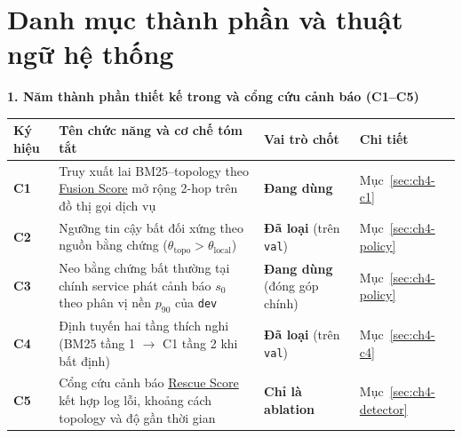 \documentclass[a4paper,table]{article}
\theoremstyle{definition}
\newcommand{\splitname}[1]{\texttt{#1}}
\newcommand{\tblfont}{\fontsize{10.5pt}{14.5pt}\selectfont}
\begin{document}
\cleardoublepage
{}
{}
\section*{Danh mục thành phần và thuật ngữ hệ thống}

\noindent\textbf{1. Năm thành phần thiết kế trong \CTAV{} và cổng cứu cảnh báo (C1--C5)}
\begin{center}
\tblfont
\renewcommand{\arraystretch}{1.25}
\begin{tabularx}{\linewidth}{|l|Y|>{\raggedright\arraybackslash}p{3.1cm}|>{\raggedright\arraybackslash}p{2.3cm}|}
  \hline
  \textbf{Ký hiệu} & \textbf{Tên chức năng và cơ chế tóm tắt} & \textbf{Vai trò chốt} & \textbf{Chi tiết} \\
  \hline
  \textbf{C1} & Truy xuất lai BM25--topology theo \hyperlink{term:FusionScore}{Fusion Score} mở rộng 2-hop trên đồ thị gọi dịch vụ & \textbf{Đang dùng} & Mục~\ref{sec:ch4-c1} \\
  \hline
  \textbf{C2} & Ngưỡng tin cậy bất đối xứng theo nguồn bằng chứng ($\theta_{\text{topo}} > \theta_{\text{local}}$) & \textbf{Đã loại} (trên \splitname{val}) & Mục~\ref{sec:ch4-policy} \\
  \hline
  \textbf{C3} & Neo bằng chứng bất thường tại chính service phát cảnh báo $s_0$ theo phân vị nền $p_{90}$ của \splitname{dev} & \textbf{Đang dùng} (đóng góp chính) & Mục~\ref{sec:ch4-policy} \\
  \hline
  \textbf{C4} & Định tuyến hai tầng thích nghi (BM25 tầng 1 $\to$ C1 tầng 2 khi bất định) & \textbf{Đã loại} (trên \splitname{val}) & Mục~\ref{sec:ch4-c4} \\
  \hline
  \textbf{C5} & Cổng cứu cảnh báo \hyperlink{term:RescueScore}{Rescue Score} kết hợp log lỗi, khoảng cách topology và độ gần thời gian & \textbf{Chỉ là ablation} & Mục~\ref{sec:ch4-detector} \\
  \hline
\end{tabularx}
\end{center}
\end{document}
